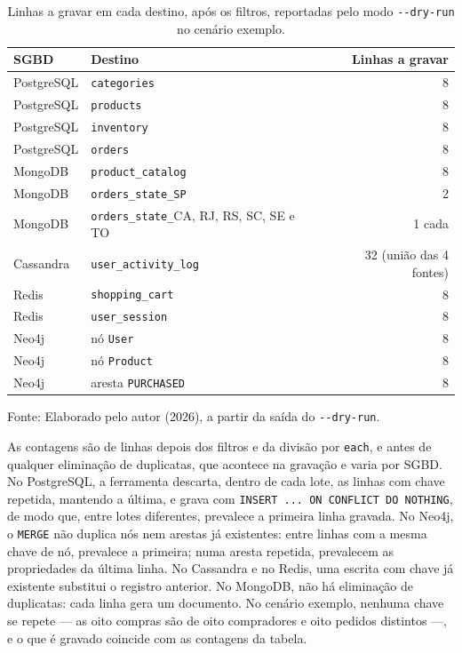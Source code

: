 \begin{table}[H]
  \caption{Linhas a gravar em cada destino, após os filtros, reportadas pelo modo \texttt{-{}-dry-run} no cenário exemplo.}
  \label{tab:dryrun}
  \centering
  \begin{tabular}{l l r}
    \toprule
    \textbf{SGBD} & \textbf{Destino} & \textbf{Linhas a gravar} \\
    \midrule
    PostgreSQL & \texttt{categories}        & 8 \\
    PostgreSQL & \texttt{products}           & 8 \\
    PostgreSQL & \texttt{inventory}          & 8 \\
    PostgreSQL & \texttt{orders}             & 8 \\
    MongoDB    & \texttt{product\_catalog}   & 8 \\
    MongoDB    & \texttt{orders\_state\_SP}  & 2 \\
    MongoDB    & \texttt{orders\_state\_}CA, RJ, RS, SC, SE e TO & 1 cada \\
    Cassandra  & \texttt{user\_activity\_log} & 32 (união das 4 fontes) \\
    Redis      & \texttt{shopping\_cart}     & 8 \\
    Redis      & \texttt{user\_session}      & 8 \\
    Neo4j      & nó \texttt{User}            & 8 \\
    Neo4j      & nó \texttt{Product}         & 8 \\
    Neo4j      & aresta \texttt{PURCHASED}   & 8 \\
    \bottomrule
  \end{tabular}
  \par\vspace{4pt}
  {\footnotesize Fonte: Elaborado pelo autor (2026), a partir da saída do \texttt{-{}-dry-run}.}
\end{table}

As contagens são de linhas depois dos filtros e da divisão por \texttt{each}, e antes de
qualquer eliminação de duplicatas, que acontece na gravação e varia por SGBD. No
PostgreSQL, a ferramenta descarta, dentro de cada lote, as linhas com chave repetida,
mantendo a última, e grava com \texttt{INSERT ... ON CONFLICT DO NOTHING}, de modo que,
entre lotes diferentes, prevalece a primeira linha gravada. No Neo4j, o \texttt{MERGE} não
duplica nós nem arestas já existentes: entre linhas com a mesma chave de nó, prevalece a
primeira; numa aresta repetida, prevalecem as propriedades da última linha. No Cassandra e no Redis, uma escrita com chave já existente substitui o
registro anterior. No MongoDB, não há eliminação de duplicatas: cada linha gera um
documento. No cenário exemplo, nenhuma chave se repete --- as oito compras são de oito
compradores e oito pedidos distintos ---, e o que é gravado coincide com as contagens da
tabela.

